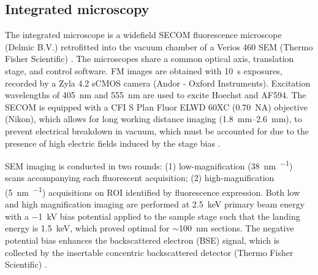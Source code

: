 \subsection{Integrated microscopy}
\label{sec:3M_integrated}
The integrated microscope is a widefield SECOM fluorescence microscope (Delmic B.V.) retrofitted into the vacuum chamber of a Verios 460 SEM (Thermo Fisher Scientific) \cite{liv2013simultaneous, zonnevylle2013integration}. The microscopes share a common optical axis, translation stage, and control software. FM images are obtained with \SI{10}{\second} exposures, recorded by a Zyla 4.2 sCMOS camera (Andor - Oxford Instruments). Excitation wavelengths of \SI{405}{\nano\meter} and \SI{555}{\nano\meter} are used to excite Hoechst and AF594. The SECOM is equipped with a CFI S Plan Fluor ELWD 60XC (\SI{0.70}{NA}) objective (Nikon), which allows for long working distance imaging (\SIrange{1.8}{2.6}{\milli\meter}), to prevent electrical breakdown in vacuum, which must be accounted for due to the presence of high electric fields induced by the stage bias \cite{vos2021retarding}.

SEM imaging is conducted in two rounds: (1) low-magnification (\SI{38}{\nano\meter\per\pixel}) scans accompanying each fluorescent acquisition; (2) high-magnification (\SI{5}{\nano\meter\per\pixel}) acquisitions on ROI identified by fluorescence expression. Both low and high magnification imaging are performed at \SI{2.5}{\kilo\electronvolt} primary beam energy with a \SI{-1}{\kilo\volt} bias potential applied to the sample stage such that the landing energy is \SI{1.5}{\kilo\electronvolt}, which proved optimal for ${\sim}$\SI{100}{\nano\meter} sections. The negative potential bias enhances the backscattered electron (BSE) signal, which is collected by the insertable concentric backscattered detector (Thermo Fisher Scientific) \cite{lane2021optimization}.


